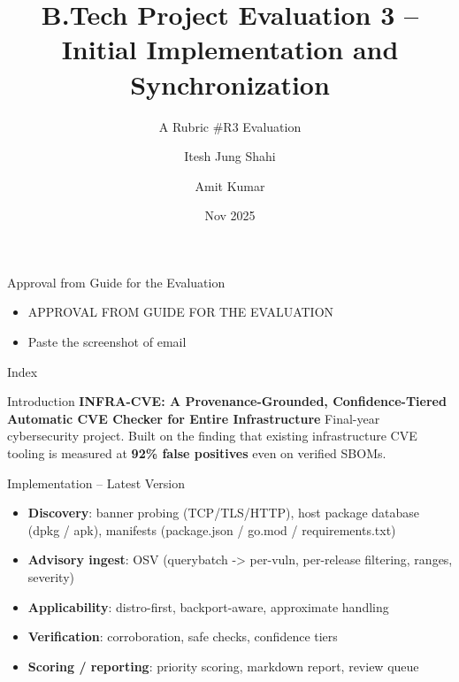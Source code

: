\documentclass[11pt]{beamer}
\title[B.Tech Project Evaluation 3]{B.Tech Project Evaluation 3 -- Initial Implementation and Synchronization}
\subtitle{A Rubric \#R3 Evaluation}
\author{Itesh Jung Shahi \and Amit Kumar}
\institute{Associate Professor, Computer Science \& Engineering\\
  Sharda School of Engineering and Technology}
\date{Nov 2025}
\begin{document}
\begin{frame}
  \titlepage
\end{frame}

\begin{frame}{Approval from Guide for the Evaluation}
  \begin{itemize}
    \item APPROVAL FROM GUIDE FOR THE EVALUATION
    \item Paste the screenshot of email
  \end{itemize}
\end{frame}

\begin{frame}{Index}
  \tableofcontents
\end{frame}

\begin{frame}{Introduction}
  \textbf{INFRA-CVE: A Provenance-Grounded, Confidence-Tiered Automatic CVE Checker for Entire Infrastructure}
  \pause
  Final-year cybersecurity project. Built on the finding that existing infrastructure CVE
  tooling is measured at \textbf{92\% false positives} even on verified SBOMs.
\end{frame}

\begin{frame}{Implementation -- Latest Version}
  \small
  \begin{itemize}
    \item \textbf{Discovery}: banner probing (TCP/TLS/HTTP), host package database (dpkg / apk),
      manifests (package.json / go.mod / requirements.txt)
    \item \textbf{Advisory ingest}: OSV (querybatch -> per-vuln, per-release filtering, ranges,
      severity)
    \item \textbf{Applicability}: distro-first, backport-aware, approximate handling
    \item \textbf{Verification}: corroboration, safe checks, confidence tiers
    \item \textbf{Scoring / reporting}: priority scoring, markdown report, review queue
  \end{itemize}
\end{frame}
\end{document}
